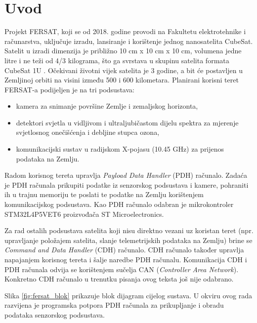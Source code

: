 \chapter{Uvod}
    Projekt FERSAT, koji se od 2018. godine provodi na Fakultetu elektrotehnike i računarstva, uključuje izradu, lansiranje i korištenje jednog nanosatelita CubeSat. Satelit u izradi dimenzija je približno 10 cm x 10 cm x 10 cm, volumena jedne litre i ne teži od 4/3 kilograma, što ga svrstava u skupinu satelita formata CubeSat 1U \cite{fersat_stranica_projekta}. Očekivani životni vijek satelita je 3 godine, a bit će postavljen u Zemljinoj orbiti na visini između 500 i 600 kilometara. Planirani korisni teret  FERSAT-a podijeljen je na tri podsustava:

    \begin{itemize}
        \item kamera za snimanje površine Zemlje i zemaljskog horizonta,
        \item detektori svjetla u vidljivom i ultraljubičastom dijelu spektra za mjerenje svjetlosnog onečišćenja i debljine stupca ozona,
        \item komunikacijski sustav u radijskom X-pojasu (10.45 GHz) za prijenos podataka na Zemlju.
    \end{itemize}

    Radom korisnog tereta upravlja \textit{Payload Data Handler} (PDH) računalo. Zadaća je PDH računala prikupiti podatke iz senzorskog podsustava i kamere, pohraniti ih u trajnu memoriju  te poslati te podatke na Zemlju korištenjem komunikacijskog podsustava. Kao PDH računalo odabran je mikrokontroler STM32L4P5VET6 proizvođača ST Microelectronics.

    Za rad ostalih podsustava satelita koji nisu direktno vezani uz koristan teret (npr. upravljanje položajem satelita, slanje telemetrijskih podataka na Zemlju) brine se \textit{Command and Data Handler} (CDH) računalo. CDH računalo također upravlja napajanjem korisnog tereta i šalje naredbe PDH računalu. Komunikacija CDH i PDH računala odvija se korištenjem sučelja CAN (\textit{Controller Area Network}). Konkretno CDH računalo u trenutku pisanja ovog teksta još nije odabrano.

    Slika \ref{fig:fersat_blok} prikazuje blok dijagram cijelog sustava. U okviru ovog rada razvijena je programska potpora PDH računala za prikupljanje i obradu podataka senzorskog podsustava.
    
